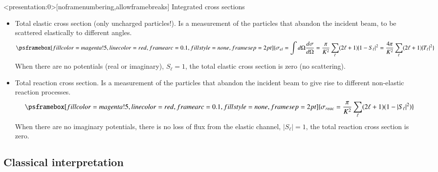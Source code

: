 \documentclass[english,10pt]{beamer}
\newcommand{\slide}[1]{\begin{frame} \frametitle{ #1}}
\begin{document}
\begin{frame}<presentation:0>[noframenumbering,allowframebreaks]
{Integrated cross sections}

\begin{itemize}
\item Total {\blue elastic} cross section (only uncharged particles!). Is a measurement of the particles that abandon the incident beam, to be scattered elastically to different angles.
$$
\psframebox[fillcolor=magenta!5,linecolor=red,framearc=0.1,fillstyle=none,framesep=2pt]{
\sigma_{el} = \int d\Omega \frac{d\sigma}{d\Omega} = \frac{\pi}{K^2} \sum_{\ell} (2 \ell + 1) |1 - S_\ell|^2  =  \frac{4 \pi}{K^2} \sum_{\ell} (2 \ell + 1) |T_\ell|^2  
}%
$$
When there are no potentials (real or imaginary), $S_\ell = 1$, the total elastic cross section is zero (no scattering).
 
\item Total {\blue reaction} cross section. Is a measurement of the particles that abandon the incident beam to give rise to different non-elastic reaction processes.
$$
\psframebox[fillcolor=magenta!5,linecolor=red,framearc=0.1,fillstyle=none,framesep=2pt]{
\sigma_{reac} = \frac{\pi}{K^2} \sum_{\ell} (2 \ell + 1) (1 - |S_\ell|^2)}
$$
When there are no imaginary potentials, there is no loss of flux from the elastic channel, $|S_\ell| = 1$, the total reaction cross section is zero.


\end{itemize}

\end{frame}

\subsection{Classical interpretation}

\slide{}
\begin{center}
\end{center} 
\end{frame}
\end{document}
